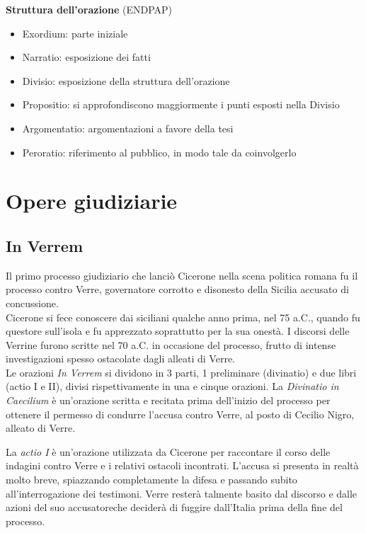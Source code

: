 \documentclass[10pt,a4paper]{article}
\begin{document}
\textbf{Struttura dell'orazione} (ENDPAP)

\begin{itemize}
	\item Exordium: parte iniziale
	\item Narratio: esposizione dei fatti
	\item Divisio: esposizione della struttura dell'orazione
	\item Propositio: si approfondiscono maggiormente i punti esposti nella Divisio
	\item Argomentatio: argomentazioni a favore della tesi
	\item Peroratio: riferimento al pubblico, in modo tale da coinvolgerlo 
\end{itemize}

\section*{Opere giudiziarie}

\subsection*{In Verrem}

Il primo processo giudiziario che lanciò Cicerone nella scena politica romana fu il processo contro Verre, governatore corrotto e disonesto della Sicilia accusato di concussione. \\

Cicerone si fece conoscere dai siciliani qualche anno prima, nel 75 a.C., quando fu questore sull'isola e fu apprezzato soprattutto per la sua onestà. I discorsi delle Verrine furono scritte nel 70 a.C. in occasione del processo, frutto di intense investigazioni spesso ostacolate dagli alleati di Verre.\\

Le orazioni \textit{In Verrem} si dividono in 3 parti, 1 preliminare (divinatio) e due libri (actio I e II), divisi rispettivamente in una e cinque orazioni. 
La \textit{Divinatio in Caecilium} è un'orazione scritta e recitata prima dell'inizio del processo per ottenere il permesso di condurre l'accusa contro Verre, al posto di Cecilio Nigro, alleato di Verre.

La \textit{actio I} è un'orazione utilizzata da Cicerone per raccontare il corso delle indagini contro Verre e i relativi ostacoli incontrati. L'accusa si presenta in  realtà molto breve, spiazzando completamente la difesa e passando subito all'interrogazione dei testimoni. Verre resterà talmente basito dal discorso e dalle azioni del suo accusatoreche deciderà di fuggire dall'Italia prima della fine del processo.
\end{document}
